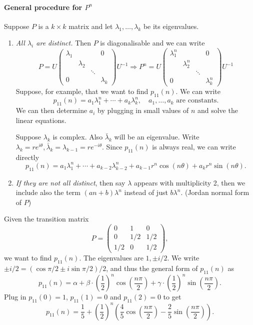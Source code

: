 \documentclass[a4paper,11pt]{article}
\begin{document}
\paragraph*{General procedure for $ P^n $} Suppose $P$ is a $k\times k$ matrix and let $ \lambda_1,\dots,\lambda_k $ be its eigenvalues.
\begin{enumerate}[(1)]
    \item \textit{All $ \lambda_i $ are distinct.} Then $P$ is diagonalisable and we can write 
    \[
        P = U \begin{pmatrix}
            \lambda_1&&&0\\ 
            &\lambda_2&&\\ 
            &&\ddots&\\ 
            0&&&\lambda_k
        \end{pmatrix}U^{-1} \Longrightarrow P^n=U \begin{pmatrix}
            \lambda^n_1&&&0\\ 
            &\lambda^n_2&&\\ 
            &&\ddots&\\ 
            0&&&\lambda^n_k
        \end{pmatrix}U^{-1}
    \]
    Suppose, for example, that we want to find $p_{11}(n)$. We can write 
    \[
        p_{11}(n)=a_1 \lambda_1^n+\cdots + a_k \lambda_k^n,\quad a_1,\dots,a_k \text{ are constants}.
    \]
    We can then determine $a_i$ by plugging in small values of $n$ and solve the linear equations.

    Suppose $\lambda_k$ is complex. Also $ \bar{\lambda}_k $ will be an eigenvalue. Write $ \lambda_k=re^{i\theta}, \bar{\lambda}_k=\lambda_{k-1}=re^{-i\theta} $. Since $p_{11}(n)$ is always real, we can write directly
    \[
        p_{11}(n)=a_1 \lambda_1^n+\cdots + a_{k-2}\lambda_{k-2}^n+a_{k-1}r^{n}\cos (n\theta)+a_kr^n \sin (n\theta).
    \]
    \item \textit{If they are not all distinct}, then say $ \lambda $ appears with multiplicity 2, then we include also the term $ (an+b)\lambda^n $ instead of just $ b\lambda^n $. (Jordan normal form of $P$)
\end{enumerate}

\begin{example}
	Given the transition matrix
	$$
	P = \begin{pmatrix}
		0 & 1 & 0 \\
		0 & 1/2 & 1/2 \\ 
		1/2 & 0 & 1/2
	\end{pmatrix},
	$$
	we want to find $p_{11}(n)$. The eigenvalues are $1, \pm i/2$. We write $\pm i/2 = (\cos \pi/2 \pm i \sin \pi/2)/2$, and thus the general form of $p_{11}(n)$ as
	$$
	p_{11}(n) = \alpha + \beta \cdot \left(\frac{1}{2}\right)^n \cos \left(\frac{n \pi}{2}\right) + \gamma \cdot \left(\frac{1}{2}\right)^n \sin\left(\frac{n \pi}{2}\right).
	$$
	Plug in $p_{11}(0) = 1$, $p_{11}(1) = 0$ and $p_{11}(2) = 0$ to get
	$$
	p_{11}(n) = \frac{1}{5} + \left(\frac{1}{2}\right)^n \left(\frac{4}{5}\cos\left(\frac{n \pi}{2}\right) - \frac{2}{5} \sin \left(\frac{n \pi}{2}\right)\right).
	$$
\end{example}
\end{document}
